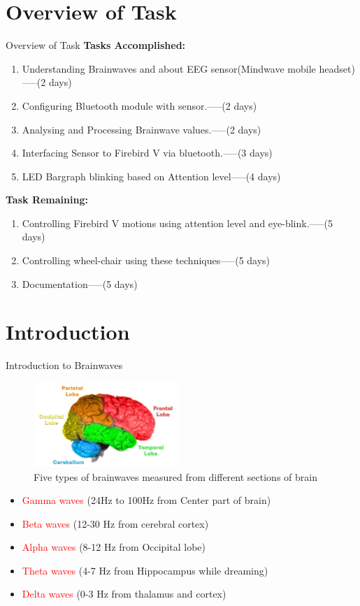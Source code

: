 \documentclass[10pt, a4paper]{beamer}
\begin{document}
\section{Overview of Task}
\begin{frame}{Overview of Task}
	\textbf{Tasks Accomplished:}
	\begin{enumerate}
	\item Understanding Brainwaves and about EEG sensor(Mindwave mobile headset)-----(2 days)
	\item Configuring Bluetooth module with sensor.-----(2 days)
	\item Analysing and Processing Brainwave values.-----(2 days)
	\item Interfacing Sensor to Firebird V via bluetooth.-----(3 days)
	\item LED Bargraph blinking based on Attention level-----(4 days)
\end{enumerate}
\textbf{Task Remaining:} 
\begin{enumerate}
	\item Controlling Firebird V motions using attention level and eye-blink.-----(5 days)
	\item Controlling wheel-chair using these techniques-----(5 days)
	\item Documentation-----(5 days)
\end{enumerate}
\end{frame}


\section{Introduction}
\begin{frame}{Introduction to Brainwaves}
	\begin{figure}[h]
		\caption{Five types of brainwaves measured from different sections of brain}
		\graphicspath{ {images/} }
		\includegraphics[width=5.5cm, height=3.2cm]{Brain-anatomy}
		\centering
	\end{figure}
	\begin{itemize}
		\item \textcolor{red}{Gamma waves} (24Hz to 100Hz from Center part of brain)
		\item \textcolor{red}{Beta waves} (12-30 Hz from cerebral cortex)
		\item \textcolor{red}{Alpha waves} (8-12 Hz from Occipital lobe)
		\item \textcolor{red}{Theta waves} (4-7 Hz from Hippocampus while dreaming)
		\item \textcolor{red}{Delta waves} (0-3 Hz from thalamus and cortex)
	\end{itemize}
\end{frame}
\end{document}
